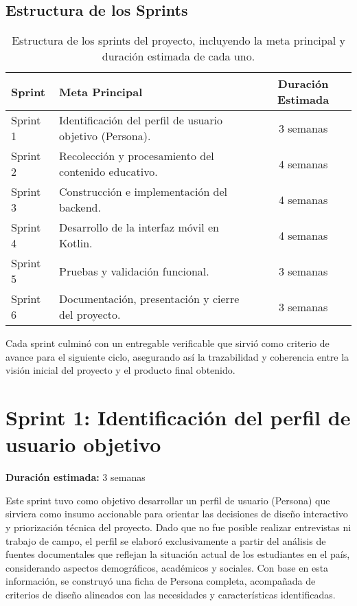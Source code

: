\subsection{Estructura de los Sprints}
\begin{table}[H]
      \centering
      \renewcommand{\arraystretch}{1.2}
      \begin{tabular}{|l|p{8cm}|c|}
            \hline
            \textbf{Sprint} & \textbf{Meta Principal}                                  & \textbf{Duración Estimada} \\ \hline
            Sprint 1        & Identificación del perfil de usuario objetivo (Persona). & 3 semanas                  \\ \hline
            Sprint 2        & Recolección y procesamiento del contenido educativo.     & 4 semanas                  \\ \hline
            Sprint 3        & Construcción e implementación del backend.               & 4 semanas                  \\ \hline
            Sprint 4        & Desarrollo de la interfaz móvil en Kotlin.               & 4 semanas                  \\ \hline
            Sprint 5        & Pruebas y validación funcional.                          & 3 semanas                  \\ \hline
            Sprint 6        & Documentación, presentación y cierre del proyecto.       & 3 semanas                  \\ \hline
      \end{tabular}
      \caption[Estructura de los Sprints]{Estructura de los sprints del proyecto, incluyendo la meta principal y duración estimada de cada uno.}
      \label{tab:estructura-sprints}
\end{table}

Cada sprint culminó con un entregable verificable que sirvió como criterio de
avance para el siguiente ciclo, asegurando así la trazabilidad y coherencia
entre la visión inicial del proyecto y el producto final obtenido.

\section{Sprint 1: Identificación del perfil de usuario objetivo}
\textbf{Duración estimada:} 3 semanas

Este sprint tuvo como objetivo desarrollar un perfil de usuario (Persona) que
sirviera como insumo accionable para orientar las decisiones de diseño
interactivo y priorización técnica del proyecto. Dado que no fue posible
realizar entrevistas ni trabajo de campo, el perfil se elaboró exclusivamente a
partir del análisis de fuentes documentales que reflejan la situación actual de
los estudiantes en el país, considerando aspectos demográficos, académicos y
sociales. Con base en esta información, se construyó una ficha de Persona
completa, acompañada de criterios de diseño alineados con las necesidades y
características identificadas.

